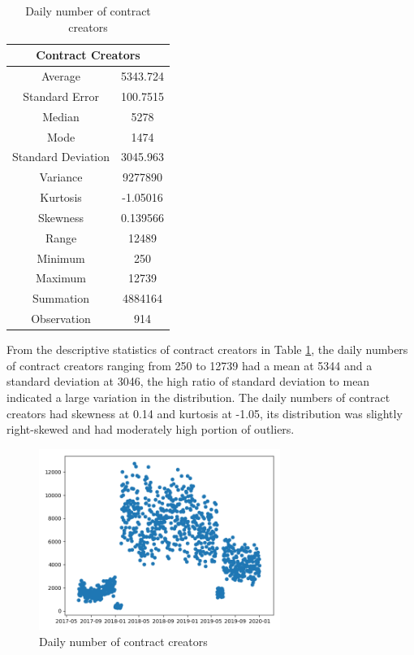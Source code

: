 \begin{table}[h]
\caption{Daily number of contract creators}
\label{tab:contract-creators}
\renewcommand\arraystretch{0.7}
\begin{tabular}{@{}cc@{}}
\toprule
\multicolumn{2}{c}{Contract Creators} \\
\midrule
Average            & 5343.724 \\
Standard   Error   & 100.7515 \\
Median             & 5278     \\
Mode               & 1474     \\
Standard Deviation & 3045.963 \\
Variance           & 9277890  \\
Kurtosis           & -1.05016 \\
Skewness           & 0.139566 \\
Range              & 12489    \\
Minimum            & 250      \\
Maximum            & 12739    \\
Summation          & 4884164  \\
Observation        & 914      \\
\bottomrule
\end{tabular}
\end{table}

From the descriptive statistics of contract creators in Table \ref{tab:contract-creators}, the daily numbers of contract creators ranging from 250 to 12739 had a mean at 5344 and a standard deviation at 3046, the high ratio of standard deviation to mean indicated a large variation in the distribution. The daily numbers of contract creators had skewness at 0.14 and kurtosis at -1.05, its distribution was slightly right-skewed and had moderately high portion of outliers.

\begin{figure}[htb]
\includegraphics[width=0.7\textwidth]{gfx/contract-creators.png}
\caption{Daily number of contract creators}
\label{fig:contract-creators}
\end{figure}

